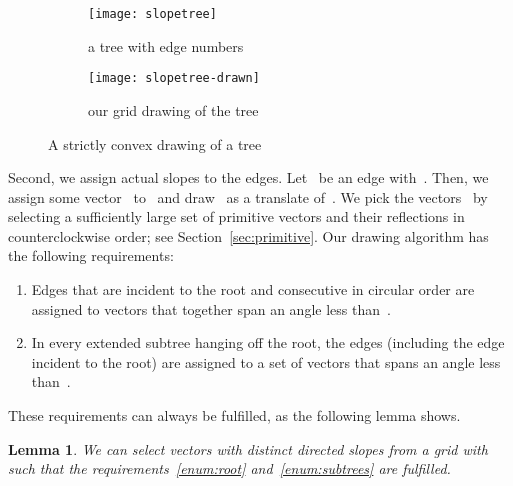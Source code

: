 \documentclass[a4paper,11pt]{article}
\theoremstyle{plain}
\newtheorem{lemma}{Lemma}
\begin{document}
\begin{figure}[tb]
  \begin{subfigure}[b]{.5\columnwidth}
    \centering
    \texttt{[image: slopetree]}
    \caption{a tree with edge numbers~ }
    \label{fig:slopetree}
  \end{subfigure}
  \hfill
  \begin{subfigure}[b]{.47\columnwidth}
    \centering
    \texttt{[image: slopetree-drawn]}
    \caption{our grid drawing of the tree}
    \label{fig:slopetree-drawn}
  \end{subfigure}
  \caption{A strictly convex drawing of a tree}
\end{figure}

Second, we assign actual slopes to the edges.  Let~ be an edge
with~.  Then, we assign some vector~ to~ and 
draw~ as a translate of~.  We pick the
vectors~ by selecting a sufficiently large
set of primitive vectors and their reflections in counterclockwise
order; see Section~\ref{sec:primitive}.  
Our drawing algorithm has the following requirements:

\begin{enumerate}[label=(R\arabic*),ref=R\arabic*]
\item \label{enum:root}Edges that are incident to the root and consecutive in circular
  order are assigned to vectors that together span  an angle less than~.
\item \label{enum:subtrees}In every extended subtree hanging off the root, the edges 
  (including the edge incident to the root) 
  are assigned to a set of vectors that spans an angle less than~.
\end{enumerate}

These requirements can always be fulfilled, as the following lemma shows.

\begin{lemma}\label{lem:slope-preselection}
  We can select  vectors with distinct directed slopes 
  from a  grid with 
  such that the requirements~\ref{enum:root}
  and~\ref{enum:subtrees} are fulfilled.
\end{lemma}
\end{document}

